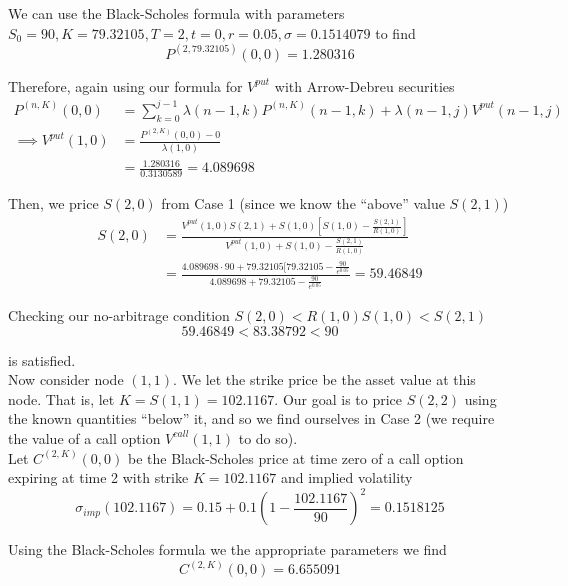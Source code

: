 \documentclass[12pt]{article}
\newlength\tindent
\renewcommand{\indent}{\hspace*{\tindent}}
\begin{document}
\indent We can use the Black-Scholes formula with parameters $S_0 = 90, K = 79.32105, T = 2, t = 0, r = 0.05, \sigma = 0.1514079$ to find
\begin{equation*}
	P^{(2,79.32105)}(0,0) = 1.280316
\end{equation*}

Therefore, again using our formula for $V^{put}$ with Arrow-Debreu securities
\begin{align*}
	P^{(n,K)}(0,0) &= \sum^{j - 1}_{k = 0} \lambda(n - 1, k)P^{(n, K)}(n - 1, k) + \lambda(n - 1, j)V^{put}(n - 1, j) \\
	\implies V^{put}(1,0) &= \frac{ P^{(2, K)}(0,0) - 0 }{ \lambda(1, 0)} \\
	&= \frac{ 1.280316 }{0.3130589} = 4.089698
\end{align*}

Then, we price $S(2,0)$ from Case 1 (since we know the ``above'' value $S(2,1)$)
\begin{align*}
	S(2,0) &= \frac{ V^{put}(1,0) S(2,1) + S(1,0)[ S(1,0) - \frac{ S(2,1)}{R(1,0)}]  }{ V^{put}(1,0) + S(1,0) - \frac{S(2,1)}{R(1,0)} } \\
	&= \frac{ 4.089698\cdot 90  + 79.32105 [ 79.32105 - \frac{ 90 }{ e^0.05 } }{ 4.089698 + 79.32105 - \frac{ 90 }{ e^0.05} } = 59.46849
\end{align*}

Checking our no-arbitrage condition $S(2,0) < R(1,0)S(1,0) < S(2,1)$
\begin{equation*}
	59.46849 < 83.38792 < 90
\end{equation*}

is satisfied. \\

\indent Now consider node $(1,1)$. We let the strike price be the asset value at this node. That is, let $K = S(1,1) = 102.1167$. Our goal is to price $S(2,2)$ using the known quantities ``below'' it, and so we find ourselves in Case 2 (we require the value of a call option $V^{call}(1,1)$ to do so). \\

\indent Let $C^{(2,K)}(0,0)$ be the Black-Scholes price at time zero of a call option expiring at time 2 with strike $K = 102.1167$ and implied volatility
\begin{equation*}
	\sigma_{imp}(102.1167) = 0.15 + 0.1 \left( 1 - \frac{102.1167}{90} \right)^2 = 0.1518125
\end{equation*}

Using the Black-Scholes formula we the appropriate parameters we find
\begin{equation*}
	C^{(2,K)}(0,0) = 6.655091
\end{equation*}
\end{document}
